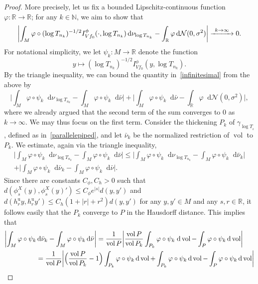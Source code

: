 \documentclass[10pt]{amsart}
\newcommand\To[1]{\mathchoice{\xrightarrow{\kern4pt#1\kern3pt}}{\stackrel{#1}{\longrightarrow}}{}{}}
\newcommand \R{\mathbb{R}}
\newcommand \N{\mathbb{N}}
\newcommand {\cN}{\mathcal{N}}
\newcommand*{\diff}{\mathop{}\!\mathrm{d}}
\DeclareMathOperator{\vol}{vol}
\theoremstyle{definition}
\begin{document}
\begin{appendix}
\begin{proof}
More precisely, let us fix a bounded Lipschitz-continuous function $\varphi\colon \R\to \R$; for any $k\in \N$, we aim to show that
\begin{equation}
\label{infinitesimal}
\biggl|\int_{M}\varphi\circ (\log{T_{n_k}})^{-1/2}I^{\phi}_{Vf_0}(\cdot,\log{T_{n_k}})\diff \nu_{\log{T_{n_k}}}-\int_{\R}\varphi\diff\cN(0,\sigma^{2})\biggr|\To{k\to\infty}0.
\end{equation}
For notational simplicity, we let $\psi_k\colon M\to \R$ denote the function
\[
y\longmapsto (\log{T_{n_k}})^{-1/2}I_{Vf_0}^{\phi}(y,\log{T_{n_k}}).
\]
By the triangle inequality, we can bound the quantity in~\eqref{infinitesimal} from the above by
\begin{equation*}
\biggl|\int_{M}\varphi\circ \psi_k \diff\nu_{\log{T_{n_k}}}-\int_{M}\varphi\circ \psi_k\diff\bar{\nu} \biggr|
+\biggl|\int_{M}\varphi\circ \psi_k\diff\bar{\nu} -\int_{\R}\varphi\diff\cN(0,\sigma^{2})\biggr|,
\end{equation*}
where we already argued that the second term of the sum converges to $0$ as $k\to\infty$. We may thus focus on the first term. Consider the thickening $P_k$ of $\gamma_{\log{T_{_k}}}$, defined as in~\eqref{parallelepiped}, and let $\bar{\nu}_k$ be the normalized restriction of $\vol$ to $P_k$.
We estimate, again via the triangle inequality,
\begin{multline*}
\biggl|\int_{M}\varphi\circ \psi_k\diff\nu_{\log{T_{n_k}}}-\int_{M}\varphi\circ \psi_k\diff\bar{\nu} \biggr|\leq
\biggl|\int_{M}\varphi\circ \psi_k\diff\nu_{\log{T_{n_k}}}-\int_{M}\varphi\circ \psi_k\diff\bar{\nu}_k \biggr|\\
+
\biggl|\int_{M}\varphi\circ \psi_k\diff\bar{\nu}_k-\int_{M}\varphi\circ \psi_k\diff\bar{\nu} \biggr|.
\end{multline*}
Since there are constants $C_{\phi},C_{h}>0$ such that $d(\phi^{X}_s(y),\phi^X_s(y)')\leq C_{\phi}e^{|s|}d(y,y')$ and $d(h^{\mathrm{u}}_ry,h^{\mathrm{u}}_ry')\leq C_{h}(1+|r|+r^{2})d(y,y')$ for any $y,y' \in M$ and any $s,r\in \R$, it follows easily that the $P_k$ converge to $P$ in the Hausdorff distance. This implies that
\begin{align*}
\biggl|\int_{M}\varphi\circ \psi_k&\diff\bar{\nu}_k-\int_{M}\varphi\circ \psi_k\diff\bar{\nu} \biggr|
=\frac{1}{\vol{P}}\biggl|\frac{\vol{P}}{\vol{P_k}}\int_{P_k}\varphi\circ \psi_k \; \text{d}\vol-\int_{P}\varphi\circ \psi_k\diff\vol\biggr|\\
&=\frac{1}{\vol{P}}\biggl|\Bigl(\frac{\vol{P}}{\vol{P_k}}-1\Bigr)\int_{P_k}\varphi\circ \psi_k\diff\vol+\int_{P_k}\varphi\circ \psi_k\diff\vol-\int_{P}\varphi\circ \psi_k\diff\vol\biggr|\\

\end{align*}
\end{proof}
\end{appendix}
\end{document}
